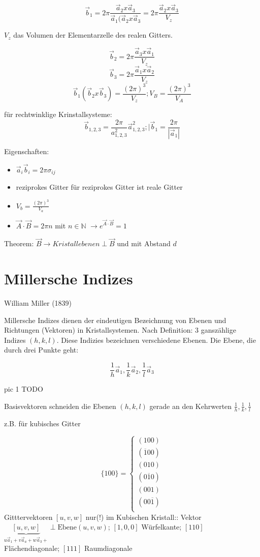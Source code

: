 \[\vec b_1 = 2\pi \frac{\vec a_2 x \vec a_3}{\vec a_1(\vec a_2 x \vec a_3}=2\pi
\frac{\vec a_2 x \vec a_3}{V_z}\]

\(V_z\) das Volumen der Elementarzelle des realen Gitters.

\[\vec b_2= 2\pi\frac{\vec a_3 x \vec a_1}{V_z}\]
\[\vec b_3= 2\pi\frac{\vec a_1 x \vec a_2}{V_z}\]
\[\vec b_1(\vec b_2 x \vec b_3)=\frac {(2\pi)^3}{V_z}; V_B=\frac
{(2\pi)^3}{V_A}\]

für rechtwinklige Krinstallsysteme: 
\[\vec b_{1,2,3}=\frac {2\pi}{a^2_{1,2,3}}\vec a^2_{1,2,3}; |\vec b_1=
\frac{2\pi}{|\vec a_1|}\]

Eigenschaften: 

\begin{itemize}
\item \(\vec a_i\vec b_i=2\pi\sigma_{ij}\)
\item reziprokes Gitter für reziprokes Gitter ist reale Gitter
\item \(V_b=\frac {(2\pi)^3}{V_a}\)
\item \(\vec A\cdot\vec B = 2\pi n\) mit \(n\in \mathbb N\) \(\rightarrow e^{\vec A\cdot\vec B }=1\)
\end{itemize}

Theorem: \(\vec B \rightarrow Kristallebenen  \perp \vec B\) und mit Abstand \(d\)


\section{Millersche Indizes}
William Miller (1839)

Millersche Indizes dienen der eindeutigen Bezeichnung von Ebenen und Richtungen
(Vektoren) in Kristallsystemen. Nach Definition: 3 ganszählige Indizes
\((h,k,l)\). Diese Indizies bezeichnen verschiedene Ebenen. Die Ebene, die durch
drei Punkte geht:

\[ \frac 1 h\vec a_1, \frac 1 k\vec a_2, \frac 1 l\vec a_3\]

pic 1 TODO

Basisvektoren schneiden die Ebenen \((h,k,l)\) gerade an den Kehrwerten \(\frac 1
h, \frac 1 k,  \frac 1 l\)

z.B. für kubisches Gitter

\[\{100\}=\begin{cases} 
(100)\\
(\overline 1 00)\\
(010)\\
(0\overline 1 0)\\
(001)\\
(00\overline 1)\\
\end{cases} 
\]
Gitttervektoren \([u,v,w]\) nur(!) im Kubischen Kristall:: Vektor
\(\underbrace{[u,v,w]}_{u\vec a_1+v\vec a_a+w\vec a_3+} \perp
\text{Ebene}(u,v,w)\); \([1,0,0]\) Würfelkante; \([110]\) Flächendiagonale; \([111]\) Raumdiagonale


